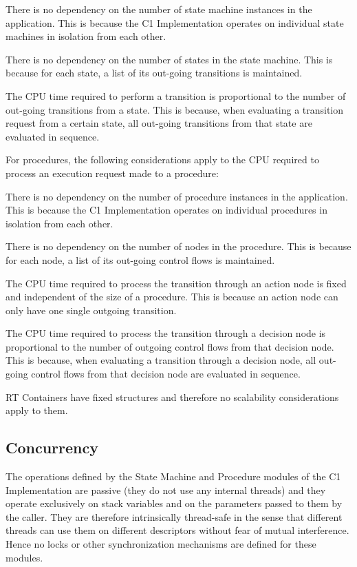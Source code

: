 \documentclass[manual]{../fwprofile}
\begin{document}
\begin{fw_itemize}
\item There is no dependency on the number of state machine instances in the application. 
This is because the C1 Implementation operates on individual state machines in isolation from each other. 
\item There is no dependency on the number of states in the state machine. 
This is because for each state, a list of its out-going transitions is maintained.  
\item The CPU time required to perform a transition is proportional to the number of out-going 
transitions from a state. This is because, when evaluating 
a transition request from a certain state, all out-going transitions from that state are evaluated in sequence.
\end{fw_itemize}

For procedures, the following considerations apply to the CPU required to process an execution 
request made to a procedure:

\begin{fw_itemize}
\item There is no dependency on the number of procedure instances in the application. 
This is because the C1 Implementation operates on individual procedures in isolation from each other. 
\item There is no dependency on the number of nodes in the procedure. 
This is because for each node, a list of its out-going control flows is maintained.  
\item The CPU time required to process the transition through an action node is fixed and independent
of the size of a procedure.
This is because an action node can only have one single outgoing transition.
\item 
The CPU time required to process the transition through a decision node is proportional to the number
of outgoing control flows from that decision node. This is because, when evaluating 
a transition through a decision node, all out-going control flows from that decision node are evaluated 
in sequence.
\end{fw_itemize}

RT Containers have fixed structures and therefore no scalability considerations apply to them.

\subsection{Concurrency}\label{sec:concurrency}
The operations defined by the State Machine and Procedure modules of the C1 Implementation are passive (they do not use any internal threads) and they operate exclusively on stack variables and on the parameters passed to them by the caller. They are therefore intrinsically thread-safe in the sense that different threads can use them on different descriptors without fear of mutual interference. Hence no locks or other synchronization mechanisms are defined for these modules.
\end{document}
